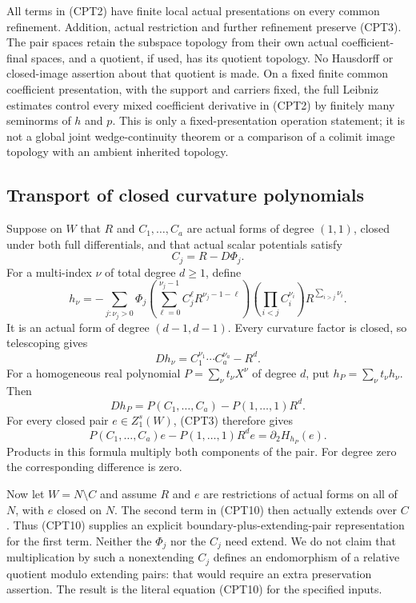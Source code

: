 All terms in (CPT2) have finite local actual presentations on
every common refinement.  Addition, actual restriction and
further refinement preserve (CPT3).  The pair spaces retain the
subspace topology from their own actual coefficient-final spaces,
and a quotient, if used, has its quotient topology.  No Hausdorff
or closed-image assertion about that quotient is made.  On a fixed
finite common coefficient presentation, with the support and
carriers fixed, the full Leibniz estimates control every mixed
coefficient derivative in (CPT2) by finitely many seminorms of
$h$ and $p$.  This is only a fixed-presentation operation statement;
it is not a global joint wedge-continuity theorem or a comparison
of a colimit image topology with an ambient inherited topology.

\subsection{Transport of closed curvature polynomials}

Suppose on $W$ that $R$ and $C_1,\ldots,C_a$ are actual
forms of degree $(1,1)$, closed under both full differentials,
and that actual scalar potentials satisfy
\[
                         C_j=R-D\Phi_j.
 \tag{CPT6}
\]
For a multi-index $\nu$ of total degree $d\ge1$, define
\[
 h_\nu=-\sum_{j:\nu_j>0}\Phi_j
   \left(\sum_{\ell=0}^{\nu_j-1}C_j^\ell R^{\nu_j-1-\ell}\right)
   \left(\prod_{i<j}C_i^{\nu_i}\right)
                            R^{\sum_{i>j}\nu_i}.
 \tag{CPT7}
\]
It is an actual form of degree $(d-1,d-1)$.  Every curvature
factor is closed, so telescoping gives
\[
                           Dh_\nu=C_1^{\nu_1}\cdots C_a^{\nu_a}-R^d.
 \tag{CPT8}
\]
For a homogeneous real polynomial $P=\sum_\nu t_\nu X^\nu$
of degree $d$, put $h_P=\sum_\nu t_\nu h_\nu$.  Then
\[
 Dh_P=P(C_1,\ldots,C_a)-P(1,\ldots,1)R^d.
 \tag{CPT9}
\]
For every closed pair $e\in Z_1^s(W)$, (CPT3) therefore gives
\[
 P(C_1,\ldots,C_a)e-P(1,\ldots,1)R^d e
                             =\partial_2 H_{h_P}(e).
 \tag{CPT10}
\]
Products in this formula multiply both components of the pair.
For degree zero the corresponding difference is zero.

Now let $W=N\setminus C$ and assume $R$ and $e$ are restrictions
of actual forms on all of $N$, with $e$ closed on $N$.
The second term in (CPT10) then actually extends over $C$.
Thus (CPT10) supplies an explicit boundary-plus-extending-pair
representation for the first term.  Neither the $\Phi_j$ nor
the $C_j$ need extend.  We do not claim that multiplication by
such a nonextending $C_j$ defines an endomorphism of a relative
quotient modulo extending pairs: that would require an extra
preservation assertion.  The result is the literal equation
(CPT10) for the specified inputs.

